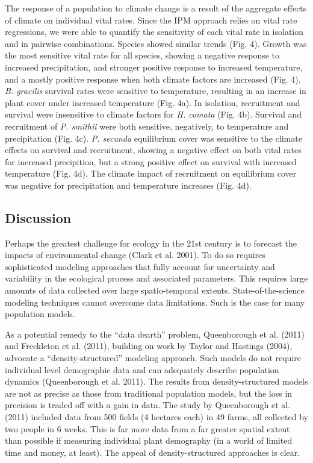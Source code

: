 \documentclass[12pt,]{article}
\begin{document}
The response of a population to climate change is a result of the
aggregate effects of climate on individual vital rates. Since the IPM
approach relies on vital rate regressions, we were able to quantify the
sensitivity of each vital rate in isolation and in pairwise
combinations. Species showed similar trends (Fig. 4). Growth was the
most sensitive vital rate for all species, showing a negative response
to increased precipitation, and stronger positive response to increased
temperature, and a mostly positive response when both climate factors
are increased (Fig. 4). \emph{B. gracilis} survival rates were sensitive
to temperature, resulting in an increase in plant cover under increased
temperature (Fig. 4a). In isolation, recruitment and survival were
insensitive to climate factors for \emph{H. comata} (Fig. 4b). Survival
and recruitment of \emph{P. smithii} were both sensitive, negatively, to
temperature and precipitation (Fig. 4c). \emph{P. secunda} equilibrium
cover was sensitive to the climate effects on survival and recruitment,
showing a negative effect on both vital rates for increased precipition,
but a strong positive effect on survival with increased temperature
(Fig. 4d). The climate impact of recruitment on equilibrium cover was
negative for precipitation and temperature increases (Fig. 4d).

\subsection{Discussion}\label{discussion}

Perhaps the greatest challenge for ecology in the 21st century is to
forecast the impacts of environmental change (Clark et al. 2001). To do
so requires sophisticated modeling approaches that fully account for
uncertainty and variability in the ecological process and associated
parameters. This requires large amounts of data collected over large
spatio-temporal extents. State-of-the-science modeling techniques cannot
overcome data limitations. Such is the case for many population models.

As a potential remedy to the ``data dearth'' problem, Queenborough et
al. (2011) and Freckleton et al. (2011), building on work by Taylor and
Hastings (2004), advocate a ``density-structured'' modeling approach.
Such models do not require individual level demographic data and can
adequately describe population dynamics (Queenborough et al. 2011). The
results from density-structured models are not as precise as those from
traditional population models, but the loss in precision is traded off
with a gain in data. The study by Queenborough et al. (2011) included
data from 500 fields (4 hectares each) in 49 farms, all collected by two
people in 6 weeks. This is far more data from a far greater spatial
extent than possible if measuring individual plant demography (in a
world of limited time and money, at least). The appeal of
density-structured approaches is clear.
\end{document}
